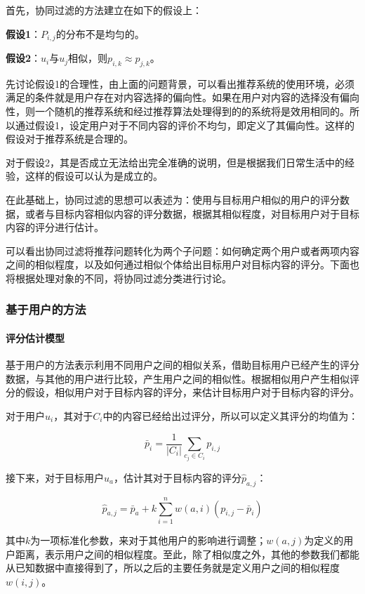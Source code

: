 首先，协同过滤的方法建立在如下的假设上：

\textbf{假设1}：$P_{i, j}$的分布不是均匀的。

\textbf{假设2}：$u_i$与$u_j$相似，则$p_{i, k} \approx p_{j, k}$。

先讨论假设1的合理性，由上面的问题背景，可以看出推荐系统的使用环境，必须满足的条件就是用户存在对内容选择的偏向性。如果在用户对内容的选择没有偏向性，则一个随机的推荐系统和经过推荐算法处理得到的的系统将是效用相同的。所以通过假设1，设定用户对于不同内容的评价不均匀，即定义了其偏向性。这样的假设对于推荐系统是合理的。

对于假设2，其是否成立无法给出完全准确的说明，但是根据我们日常生活中的经验，这样的假设可以认为是成立的。

在此基础上，协同过滤的思想可以表述为：使用与目标用户相似的用户的评分数据，或者与目标内容相似内容的评分数据，根据其相似程度，对目标用户对于目标内容的评分进行估计。

可以看出协同过滤将推荐问题转化为两个子问题：如何确定两个用户或者两项内容之间的相似程度，以及如何通过相似个体给出目标用户对目标内容的评分\cite{CFSurvey}。下面也将根据处理对象的不同，将协同过滤分类进行讨论。

\subsubsection{基于用户的方法}
\paragraph{评分估计模型}
基于用户的方法表示利用不同用户之间的相似关系，借助目标用户已经产生的评分数据，与其他的用户进行比较，产生用户之间的相似性。根据相似用户产生相似评分的假设，相似用户对于目标内容的评分，来估计目标用户对于目标内容的评分\cite{UserCF}。

对于用户$u_i$，其对于$C_i$中的内容已经给出过评分，所以可以定义其评分的均值为：

\begin{equation}
    \bar p_i = \frac{1}{|C_i|}\sum_{c_j \in C_i}p_{i, j}
\end{equation}

接下来，对于目标用户$u_a$，估计其对于目标内容的评分$\hat p_{a, j}$：

\begin{equation}
    \hat p_{a,j} = \bar p_a + k \sum_{i=1}^n w(a,i)(p_{i,j}-\bar p_i)
\end{equation}

其中$k$为一项标准化参数，来对于其他用户的影响进行调整；$w(a, j)$为定义的用户距离，表示用户之间的相似程度\cite{UserCF}。至此，除了相似度之外，其他的参数我们都能从已知数据中直接得到了，所以之后的主要任务就是定义用户之间的相似程度$w(i, j)$。

